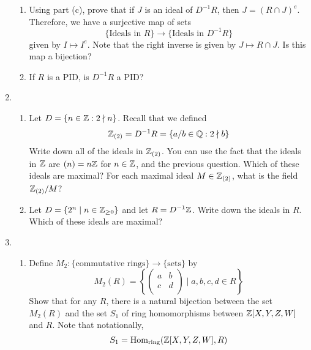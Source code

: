 \documentclass[../psets.tex]{subfiles}
\begin{document}
\begin{enumerate}
\begin{enumerate}[label={(\alph*)}]
        \item Using part (c), prove that if $J$ is an ideal of $D^{-1}R$, then $J=(R\cap J)^e$. Therefore, we have a surjective map of sets
        \begin{equation*}
            \{\text{Ideals in }R\} \to \{\text{Ideals in }D^{-1}R\}
        \end{equation*}
        given by $I\mapsto I^e$. Note that the right inverse is given by $J\mapsto R\cap J$. Is this map a bijection?
        \item If $R$ is a PID, is $D^{-1}R$ a PID?
    \end{enumerate}
    \item 
    \begin{enumerate}[label={(\alph*)}]
        \item Let $D=\{n\in\mathbb{Z}:2\nmid n\}$. Recall that we defined
        \begin{equation*}
            \mathbb{Z}_{(2)} = D^{-1}R
            = \{a/b\in\mathbb{Q}:2\nmid b\}
        \end{equation*}
        Write down all of the ideals in $\mathbb{Z}_{(2)}$. You can use the fact that the ideals in $\mathbb{Z}$ are $(n)=n\mathbb{Z}$ for $n\in\mathbb{Z}$, and the previous question. Which of these ideals are maximal? For each maximal ideal $M\in\mathbb{Z}_{(2)}$, what is the field $\mathbb{Z}_{(2)}/M$?
        \item Let $D=\{2^n\mid n\in{\mathbb{Z}_{\geq 0}}\}$ and let $R=D^{-1}\mathbb{Z}$. Write down the ideals in $R$. Which of these ideals are maximal?
    \end{enumerate}
    \item 
    \begin{enumerate}[label={(\alph*)}]
        \item Define $M_2:\{\text{commutative rings}\}\to\{\text{sets}\}$ by
        \begin{equation*}
            M_2(R) = \left\{
                \begin{pmatrix}
                    a & b\\
                    c & d\\
                \end{pmatrix}
                \mid a,b,c,d\in R
            \right\}
        \end{equation*}
        Show that for any $R$, there is a natural bijection between the set $M_2(R)$ and the set $S_1$ of ring homomorphisms between $\mathbb{Z}[X,Y,Z,W]$ and $R$. Note that notationally,
        \begin{equation*}
            S_1 = \text{Hom}_\text{ring}(\Z[X,Y,Z,W],R)

\end{equation*}
\end{enumerate}
\end{enumerate}
\end{document}

